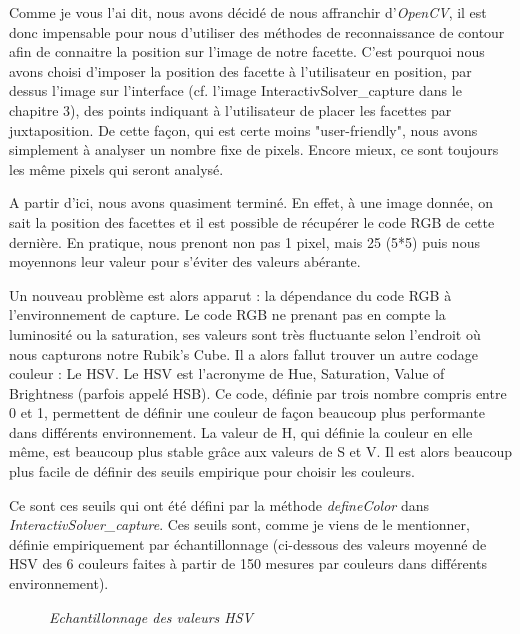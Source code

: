Comme je vous l'ai dit, nous avons décidé de nous affranchir d'\textit{OpenCV}, il est donc impensable pour nous d'utiliser des méthodes de reconnaissance de contour
afin de connaitre la position sur l'image de notre facette. 
C'est pourquoi nous avons choisi d'imposer la position des facette à l'utilisateur en position, par dessus l'image sur l'interface (cf. l'image InteractivSolver\_capture
dans le chapitre 3), des points indiquant à l'utilisateur de placer les facettes par juxtaposition. De cette façon, qui est certe moins "user-friendly", nous avons simplement 
à analyser un nombre fixe de pixels. Encore mieux, ce sont toujours les même pixels qui seront analysé.

A partir d'ici, nous avons quasiment terminé. En effet, à une image donnée, on sait la position des facettes et il est possible de récupérer le code RGB de cette dernière. 
En pratique, nous prenont non pas 1 pixel, mais 25 (5*5) puis nous moyennons leur valeur pour s'éviter des valeurs abérante.

Un nouveau problème est alors apparut : la dépendance du code RGB à l'environnement de capture. Le code RGB ne prenant pas en compte la luminosité ou la saturation, ses valeurs 
sont très fluctuante selon l'endroit où nous capturons notre Rubik's Cube. Il a alors fallut trouver un autre codage couleur : Le HSV.
Le HSV est l'acronyme de Hue, Saturation, Value of Brightness (parfois appelé HSB). Ce code, définie par trois nombre compris entre 0 et 1, permettent de définir une couleur de façon 
beaucoup plus performante dans différents environnement. La valeur de H, qui définie la couleur en elle même, est beaucoup plus stable grâce aux valeurs de S et V. Il est alors beaucoup 
plus facile de définir des seuils empirique pour choisir les couleurs.

Ce sont ces seuils qui ont été défini par la méthode \textit{defineColor} dans \textit{InteractivSolver\_capture}.
Ces seuils sont, comme je viens de le mentionner, définie empiriquement par échantillonnage (ci-dessous des valeurs moyenné de HSV des 6 couleurs faites à partir de 150 mesures par couleurs dans différents environnement).

\begin{figure}[H]
\begin{center}
\end{center}
	\caption{ \textit{Echantillonnage des valeurs HSV}}
\end{figure}

